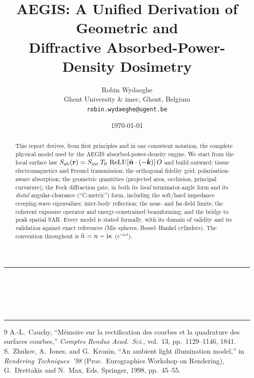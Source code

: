 \documentclass[11pt,a4paper]{article}
\title{\textbf{AEGIS: A Unified Derivation of Geometric and\\[0.3em]
Diffractive Absorbed-Power-Density Dosimetry}}
\author{%
  Robin Wydaeghe \\
  Ghent University \& imec, Ghent, Belgium \\
  \normalfont\texttt{robin.wydaeghe@ugent.be}
}
\date{\today}
\makeatletter
\renewcommand{\maketitle}{%
  \thispagestyle{plain}%
  \begin{center}
    \rule{\linewidth}{1pt}\\[0.4em]
    {\LARGE\bfseries \@title}\\[0.5em]
    {\large \@author}\\[0.3em]
    {\small \@date}
    \\[0.4em]\rule{\linewidth}{1pt}
  \end{center}
  \vspace{0.5em}
}
\makeatother
\begin{document}
\maketitle

\begin{abstract}
This report derives, from first principles and in one consistent notation, the
complete physical model used by the AEGIS absorbed-power-density engine. We start
from the local surface law $S_{\mathrm{ab}}(\mathbf{r})=S_{\mathrm{inc}}\,T_0\,\operatorname{ReLU}[\hat{\bm{n}}\cdot(-\hat{\bm{k}})]\,O$
and build outward: tissue electromagnetics and Fresnel transmission; the
orthogonal fidelity grid; polarisation-aware absorption; the geometric quantities
(projected area, occlusion, principal curvature); the Fock diffraction gate, in
both its \emph{local} terminator-angle form and its \emph{distal} angular-clearance
(``C-metric'') form, including the soft/hard impedance creeping-wave eigenvalues;
inter-body reflection; the near- and far-field limits; the coherent exposure
operator and energy-constrained beamforming; and the bridge to peak spatial SAR.
Every model is stated formally, with its domain of validity and its validation
against exact references (Mie spheres, Bessel--Hankel cylinders). The convention
throughout is $\tilde{n} = n - \mathrm{i}\kappa$ ($e^{+\mathrm{i}\omega t}$).
\end{abstract}

\tableofcontents
\bigskip















\begin{thebibliography}{9}
  A.-L.~Cauchy, ``M\'{e}moire sur la rectification des courbes et la
  quadrature des surfaces courbes,'' \textit{Comptes Rendus Acad.\ Sci.},
  vol.~13, pp.~1129--1146, 1841.
  S.~Zhukov, A.~Iones, and G.~Kronin, ``An ambient light illumination
  model,'' in \textit{Rendering Techniques~'98} (Proc.\ Eurographics
  Workshop on Rendering), G.~Drettakis and N.~Max, Eds. Springer, 1998,
  pp.~45--55.
\end{thebibliography}
\end{document}
